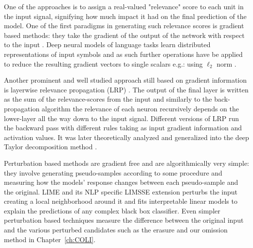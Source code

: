 One of the approaches is to assign a real-valued "relevance" score to each unit in the input signal,
signifying how much impact it had on the final prediction of the model.
One of the first paradigms in generating such relevance scores is gradient based methods:
they take the gradient of the output of the network with respect to the input \citep{simonyan2013deep}.
Deep neural models of language tasks learn distributed representations of input symbols
and as such further operations have be applied to reduce the resulting gradient vectors to
single scalars e.g.: using $\ell_2$ norm \citep{bansal2016ask}.

Another prominent and well studied
approach still based on gradient information is layerwise
relevance propagation (LRP) \citep{bach2015pixel}. The output of the final layer
is written as the sum of the relevance-scores from the input and similarly to the back-propagation
algorithm the relevance of each neuron
recursively depends on the lower-layer all the way down to the input signal.
Different versions of LRP run the backward pass with different rules taking as
input gradient information and activation values. It was later theoretically analyzed and generalized
into the deep Taylor decomposition method \citep{binder2016layer}.


Perturbation based methods are gradient free and are algorithmically very simple: they involve generating
pseudo-samples according to some procedure and measuring how the models' response changes
between each pseudo-sample and the original.
LIME \citep{ribeiro2016should} and its NLP specific LIMSSE extension
\citep{poerner2018evaluating} perturbs
the input creating a local neighborhood around it and fits interpretable linear models to explain
the predictions of any complex black box classifier.
Even simpler perturbation based techniques measure the
difference between the original input and the various perturbed candidates such as the erasure
\citep{li2016understanding} and our omission \citep{kadar2017representation} method in Chapter~\ref{ch:COLI}.


